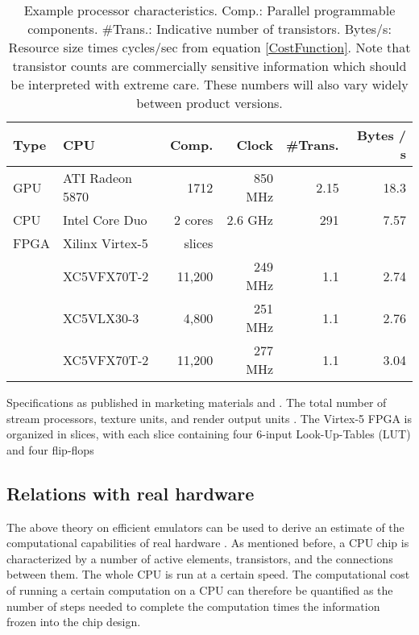 \documentclass{article}
\begin{document}
\begin{table}
\caption{Example processor characteristics.
Comp.: Parallel programmable components. \#Trans.: Indicative number of transistors.
Bytes/s: Resource size  times cycles/sec from equation 
\ref{CostFunction}. Note that transistor counts are commercially sensitive
information which should be interpreted with extreme care. These numbers will also vary
widely between product versions.} 
\begin{tabular}{llrrrr}
Type &CPU & Comp.& Clock & \#Trans. & Bytes / s\\
\hline
GPU & ATI Radeon 5870 & 1712 & 850 MHz& 2.15 & 18.3\\
CPU & Intel Core Duo & 2 cores& 2.6 GHz & 291 & 7.57\\
FPGA & Xilinx Virtex-5 &  slices& &  &\\
 &\hfill{\footnotesize XC5VFX70T-2} & 11,200 &  249 MHz& 1.1 & 2.74\\
 &\hfill{\footnotesize XC5VLX30-3} & 4,800 &  251 MHz& 1.1 & 2.76\\
 &\hfill{\footnotesize XC5VFX70T-2} & 11,200&  277 MHz& 1.1 & 3.04\\
\end{tabular}\newline
{\footnotesize  Specifications as published in marketing materials and 
\cite{WikipediaCoreDuo,WikipediaTransistorCount,LoydCase2009}.
 The total number of stream processors, texture units, and render output units
\cite{LoydCase2009}.
 The Virtex-5 FPGA is organized in slices, with each slice containing four 6-input 
Look-Up-Tables (LUT) and four flip-flops \cite{NationalInstrumentsVirtex5,specification-virtex}}
\label{TabChipChars}
\end{table}

\begin{comment}
GPU:  850*10^6 * 2.15*10^9
CPU:  2.6*10^9 * 291*10^6
XC5VFX70T-2: 249.4 * 10^6 * 1.1*10^9
XC5VLX30-3  : 251 * 10^6 * 1.1*10^9
XC5VFX70T-2: 276.7*10^6 * 1.1*10^9
\end{comment}

\subsection{Relations with real hardware}\label{RealHardware}

The above theory on efficient emulators can be used to derive an estimate
of the computational capabilities of real hardware \cite{Son0911-5262}. 
As mentioned before, a CPU chip is characterized by a number of active
elements, transistors, and the connections between them. The whole CPU is 
run at a certain speed. The computational cost of running a certain 
computation on a CPU can therefore  be quantified as the number of steps
needed to complete the computation times the information frozen into the
chip design.
\end{document}
